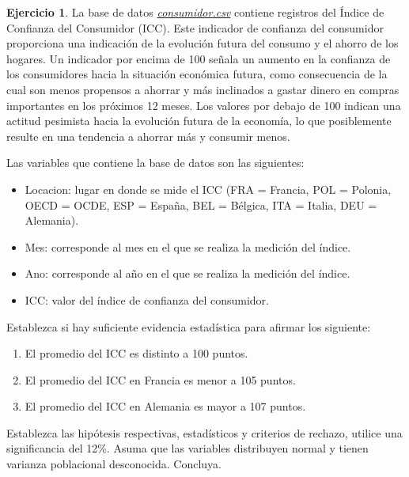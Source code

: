 \documentclass[
]{book}
\providecommand{\tightlist}{%
  \setlength{\itemsep}{0pt}\setlength{\parskip}{0pt}}
\theoremstyle{definition}
\theoremstyle{definition}
\theoremstyle{definition}
\newtheorem{exercise}{Ejercicio}[chapter]
\theoremstyle{definition}
\theoremstyle{remark}
\begin{document}
\begin{exercise}
\protect\hypertarget{exr:consumidor}{}\label{exr:consumidor}La base de datos \href{https://raw.githubusercontent.com/Dfranzani/Bases-de-datos-para-cursos/main/2022-2/Estad\%C3\%ADstica\%202/consumidor.csv}{\emph{consumidor.csv}} contiene registros del Índice de Confianza del Consumidor (ICC). Este indicador de confianza del consumidor proporciona una indicación de la evolución futura del consumo y el ahorro de los hogares. Un indicador por encima de 100 señala un aumento en la confianza de los consumidores hacia la situación económica futura, como consecuencia de la cual son menos propensos a ahorrar y más inclinados a gastar dinero en compras importantes en los próximos 12 meses. Los valores por debajo de 100 indican una actitud pesimista hacia la evolución futura de la economía, lo que posiblemente resulte en una tendencia a ahorrar más y consumir menos.

Las variables que contiene la base de datos son las siguientes:

\begin{itemize}
\tightlist
\item
  Locacion: lugar en donde se mide el ICC (FRA = Francia, POL = Polonia, OECD = OCDE, ESP = España, BEL = Bélgica, ITA = Italia, DEU = Alemania).
\item
  Mes: corresponde al mes en el que se realiza la medición del índice.
\item
  Ano: corresponde al año en el que se realiza la medición del índice.
\item
  ICC: valor del índice de confianza del consumidor.
\end{itemize}

Establezca si hay suficiente evidencia estadística para afirmar los siguiente:

\begin{enumerate}
\def\labelenumi{\arabic{enumi}.}
\tightlist
\item
  El promedio del ICC es distinto a 100 puntos.
\item
  El promedio del ICC en Francia es menor a 105 puntos.
\item
  El promedio del ICC en Alemania es mayor a 107 puntos.
\end{enumerate}

Establezca las hipótesis respectivas, estadísticos y criterios de rechazo, utilice una significancia del 12\%. Asuma que las variables distribuyen normal y tienen varianza poblacional desconocida. Concluya.
\end{exercise}
\end{document}
